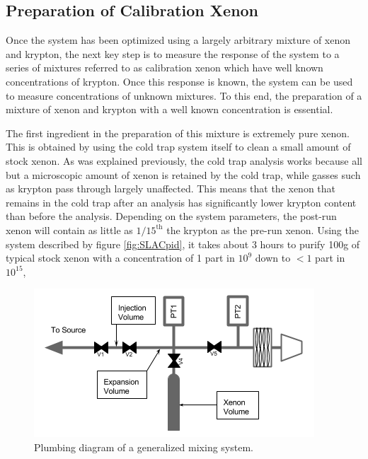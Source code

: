 \documentclass[12pt]{article}
\begin{document}
\subsection{Preparation of Calibration Xenon}
Once the system has been optimized using a largely arbitrary mixture of xenon and krypton, the next key step is to measure the response of the system to a series of mixtures referred to as calibration xenon which have well known concentrations of krypton. Once this response is known, the system can be used to measure concentrations of unknown mixtures. To this end, the preparation of a mixture of xenon and krypton with a well known concentration is essential.

The first ingredient in the preparation of this mixture is extremely pure xenon. This is obtained by using the cold trap system itself to clean a small amount of stock xenon. As was explained previously, the cold trap analysis works because all but a microscopic amount of xenon is retained by the cold trap, while gasses such as krypton pass through largely unaffected. This means that the xenon that remains in the cold trap after an analysis has significantly lower krypton content than before the analysis. Depending on the system parameters, the post-run xenon will contain as little as $1/15^{\textrm{th}}$ the krypton as the pre-run xenon. Using the system described by figure \ref{fig:SLACpid}, it takes about 3 hours to purify 100g of typical stock xenon with a concentration of 1 part in $10^{9}$ down to $< 1$ part in $10^{15}$, 
\begin{figure}[h]
  \includegraphics[width=\linewidth]{Figures/Mixing_diagram.png}
  \caption{Plumbing diagram of a generalized mixing system. }
  \label{fig:mixpid}
\end{figure}
\end{document}
